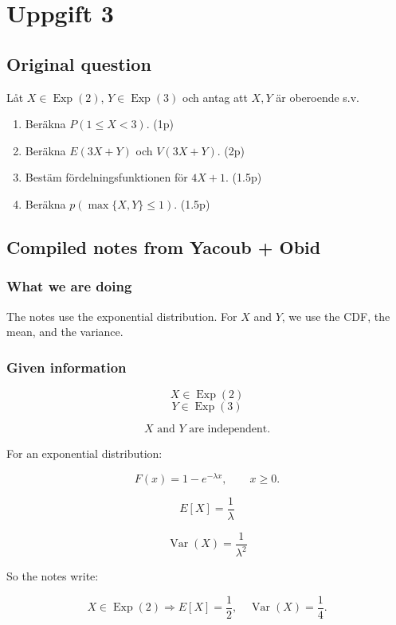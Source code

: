 \documentclass[10pt]{article}
\begin{document}
\section*{Uppgift 3}

\subsection*{Original question}
Låt \(X \in \operatorname{Exp}(2)\),
\(Y \in \operatorname{Exp}(3)\) och antag att
\(X, Y\) är oberoende s.v.

\begin{enumerate}[label=\alph*)]
\item Beräkna \(P(1 \leq X < 3)\). \hfill (1p)
\item Beräkna \(E(3X+Y)\) och \(V(3X+Y)\). \hfill (2p)
\item Bestäm fördelningsfunktionen för \(4X+1\). \hfill (1.5p)
\item Beräkna \(p(\max\{X,Y\}\leq 1)\). \hfill (1.5p)
\end{enumerate}

\subsection*{Compiled notes from Yacoub + Obid}

\subsubsection*{What we are doing}
The notes use the exponential distribution.
For \(X\) and \(Y\), we use the CDF,
the mean, and the variance.

\subsubsection*{Given information}
\[
X\in \operatorname{Exp}(2)
\]
\[
Y\in \operatorname{Exp}(3)
\]

\[
X \text{ and } Y
\text{ are independent.}
\]

For an exponential distribution:

\[
F(x)=1-e^{-\lambda x},
\qquad x\geq 0.
\]

\[
E[X]=\frac{1}{\lambda}
\]

\[
\operatorname{Var}(X)=\frac{1}{\lambda^2}
\]

So the notes write:

\[
X\in \operatorname{Exp}(2)
\Rightarrow
E[X]=\frac{1}{2},
\quad
\operatorname{Var}(X)=\frac{1}{4}.
\]
\end{document}
